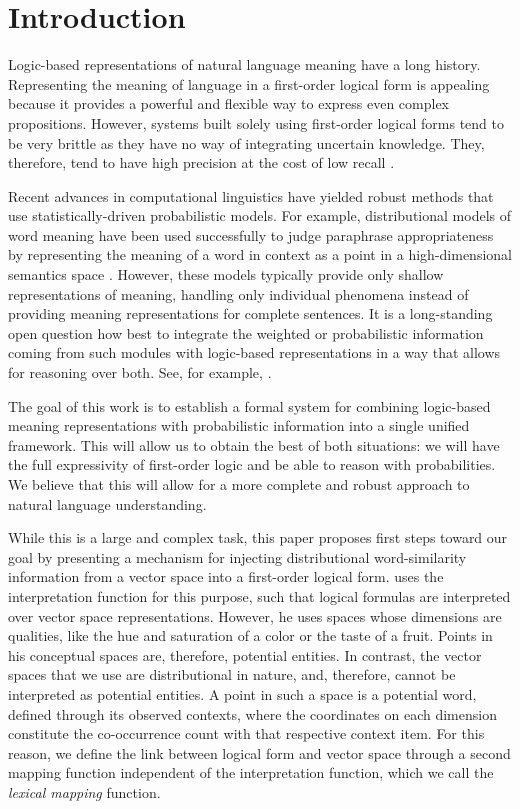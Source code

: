 \section{Introduction}

Logic-based representations of natural language meaning have a long history.
Representing the meaning of language in a first-order logical form is appealing
because it provides a powerful and flexible way to express even complex
propositions. However, systems built solely using first-order logical forms tend
to be very brittle as they have no way of integrating uncertain knowledge.
They, therefore, tend to have high precision at the cost of low recall
\citep{bos:emnlp2005}.

Recent advances in computational linguistics have yielded robust methods that
use statistically-driven probabilistic models.  For example, distributional
models of word meaning have been used successfully to judge paraphrase
appropriateness by representing the meaning of a word in context as a point in a
high-dimensional semantics space \citep{erk:emnlp08,thater:acl2010,erk:acl2010}.
However, these models typically provide only shallow representations of meaning,
handling only individual phenomena instead of providing meaning representations
for complete sentences. It is a long-standing open question how best to
integrate the weighted or probabilistic information coming from such modules
with logic-based representations in a way that allows for reasoning over both. 
See, for example, \citet{hobbs:alj93}.

The goal of this work is to establish a formal system for combining
logic-based meaning representations with probabilistic information into a single
unified framework.  This will allow us to obtain the best of both situations: we
will have the full expressivity of first-order logic and be able to reason with
probabilities.  We believe that this will allow for a more complete and robust
approach to natural language understanding.

While this is a large and complex task, this paper proposes first steps toward
our goal by presenting a mechanism for injecting distributional word-similarity
information from a vector space into a first-order logical form.  
\citet{gardenfors:book2004} uses the interpretation function for this purpose,
such that logical formulas are interpreted over vector space representations.
However, he uses spaces whose dimensions are qualities, like the hue and
saturation of a color or the taste of a fruit. Points in his conceptual spaces
are, therefore, potential entities.  In contrast, the vector spaces that we use
are distributional in nature, and, therefore, cannot be interpreted as potential
entities. A point in such a space is a potential word, defined through
its observed contexts, where the coordinates on each dimension constitute the
co-occurrence count with that respective context item.  For this reason, we
define the link between logical form and vector space through a second mapping
function independent of the interpretation function, which we call the
\emph{lexical mapping} function.

